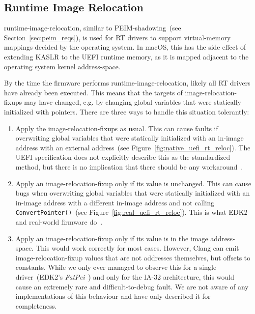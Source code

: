 \subsection{Runtime Image Relocation}

\Gls{runtime-image-relocation}, similar to \gls{PEIM-shadowing}~(see Section~\ref{sec:peim_reqs}), is used for \gls{RT} drivers to support \gls{virtual-memory} mappings decided by the operating system. In macOS, this has the side effect of extending \gls{KASLR} to the \gls{UEFI} runtime memory, as it is mapped adjacent to the operating system kernel \gls{address-space}.

By the time the \gls{firmware} performs \gls{runtime-image-relocation}, likely all \gls{RT} drivers have already been executed. This means that the targets of \glspl{image-relocation-fixup} may have changed, e.g. by changing global variables that were statically initialized with pointers. There are three ways to handle this situation tolerantly:
\begin{enumerate}
  \item Apply the \glspl{image-relocation-fixup} as usual. This can cause faults if overwriting global variables that were statically initialized with an in-\gls{image} address with an external address~(see Figure~\ref{fig:native_uefi_rt_reloc}). The \gls{UEFI} specification does not explicitly describe this as the standardized method, but there is no implication that there should be any workaround~\cite{uefi-spec}.
  \item Apply an \gls{image-relocation-fixup} only if its value is unchanged. This can cause bugs when overwriting global variables that were statically initialized with an in-\gls{image} address with a different in-\gls{image} address and not calling \lstinline|ConvertPointer()|~(see Figure~\ref{fig:real_uefi_rt_reloc}). This is what \gls{EDK2} and real-world \gls{firmware} do~\cite{edk2}.
  \item Apply an \gls{image-relocation-fixup} only if its value is in the \gls{image} \gls{address-space}. This would work correctly for most cases. However, Clang can emit \gls{image-relocation-fixup} values that are not addresses themselves, but offsets to constants. While we only ever managed to observe this for a single driver~(\gls{EDK2}'s \textit{FatPei}~\cite{edk2}) and only for the IA-32 architecture, this would cause an extremely rare and difficult-to-debug fault. We are not aware of any implementations of this behaviour and have only described it for completeness.
\end{enumerate}

